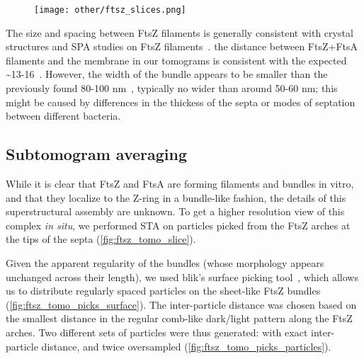 \begin{figure}[ht]
    \centering
    \texttt{[image: other/ftsz\_slices.png]}
    \label{fig:ftsz_tomo_slice}
\end{figure}

The size and spacing between FtsZ filaments is generally consistent with crystal structures and SPA studies on FtsZ filaments~\cite{mcquillenInsightsStructureFunction2020}.
the distance between FtsZ+FtsA filaments and the membrane in our tomograms is consistent with the expected \sim13-16~\cite{mcquillenInsightsStructureFunction2020}.
However, the width of the bundle appears to be smaller than the previously found 80-100 nm~\cite{mcquillenInsightsStructureFunction2020}, typically no wider than around 50-60 nm; this might be caused by differences in the thickess of the septa or modes of septation between different bacteria.

\subsection{Subtomogram averaging}

While it is clear that FtsZ and FtsA are forming filaments and bundles in vitro, and that they localize to the Z-ring in a bundle-like fashion, the details of this superstructural assembly are unknown.
To get a higher resolution view of this complex \textit{in situ}, we performed STA on particles picked from the FtsZ arches at the tips of the septa (\autoref{fig:ftsz_tomo_slice}).

Given the apparent regularity of the bundles (whose morphology appears unchanged across their length), we used blik's surface picking tool~\cite{gaifasBlikExtensible3D2024,gaifasBlikPythonTool2024}, which allows us to distribute regularly spaced particles on the sheet-like FtsZ bundles (\autoref{fig:ftsz_tomo_picks_surface}).
The inter-particle distance was chosen based on the smallest distance in the regular comb-like dark/light pattern along the FtsZ arches. %
Two different sets of particles were thus generated: with exact inter-particle distance, and twice oversampled  (\autoref{fig:ftsz_tomo_picks_particles}).


